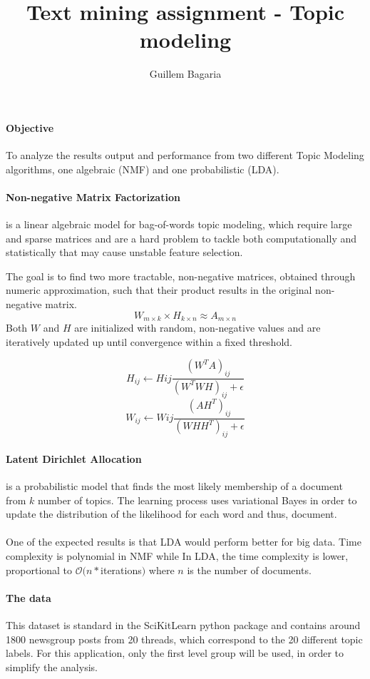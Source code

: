 \documentclass[12pt,a4paper]{report}
\author{Guillem Bagaria}
\title{Text mining assignment - Topic modeling}
\date{}
\begin{document}
\maketitle

\paragraph{Objective} To analyze the results output and performance from two different Topic Modeling algorithms, one algebraic (NMF) and one probabilistic (LDA).


\paragraph{Non-negative Matrix Factorization} is a linear algebraic model for bag-of-words topic modeling, which require large and sparse matrices and are a hard problem to tackle both computationally and statistically that may cause unstable feature selection.

The goal is to find two more tractable, non-negative matrices, obtained through numeric approximation, such that their product results in the original non-negative matrix. $$W_{m\times k} \times H_{k\times n} \approx A_{m\times n}$$
Both $W$ and $H$ are initialized with random, non-negative values and are iteratively updated up until convergence within a fixed threshold.

$$
H_{ij} \leftarrow H{ij} \frac{(W^T A)_{ij}}{(W^T WH)_{ij}+\epsilon} $$
$$
W_{ij} \leftarrow W{ij} \frac{(A H^T)_{ij}}{(WHH^T)_{ij}+\epsilon} 
$$


\paragraph{Latent Dirichlet Allocation} is a probabilistic model that finds the most likely membership of a document from $k$ number of topics. The learning process uses variational Bayes in order to update the distribution of the likelihood for each word and thus, document.

\paragraph{} One of the expected results is that LDA would perform better for big data. Time complexity is polynomial in NMF while In LDA, the time complexity is lower, proportional to $\mathcal{O}(n * $iterations$)$ where $n$ is the number of documents.


\paragraph{The data} This dataset is standard in the SciKitLearn python package and contains around 1800 newsgroup posts from 20 threads, which correspond to the 20 different topic labels. For this application, only the first level group will be used, in order to simplify the analysis.
\end{document}
